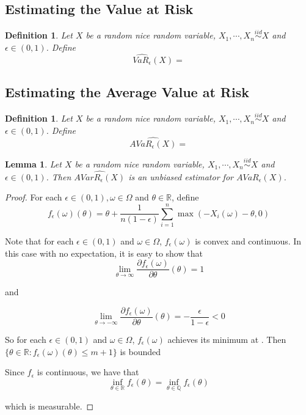 \documentclass[12pt]{amsart}
\newtheorem{lem}[thm]{Lemma}
\newtheorem{defn}[thm]{Definition}
\newcommand{\ep}{\epsilon}
\newcommand{\om}{\omega}
\newcommand{\Om}{\Omega}
\newcommand{\R}{\mathbb{R}}
\newcommand{\Q}{\mathbb{Q}}
\begin{document}
\subsection{Estimating the Value at Risk}

\begin{defn}
Let $X$ be a random nice random variable, $X_1, \cdots , X_n \stackrel{iid}{\sim} X$ and $\ep \in (0,1)$. Define $$\widehat{VaR_\ep}(X) = $$
\end{defn}

\subsection{Estimating the Average Value at Risk}

\begin{defn}
Let $X$ be a random nice random variable, $X_1, \cdots , X_n \stackrel{iid}{\sim} X$ and $\ep \in (0,1)$. Define $$ \widehat{AVaR_{\ep}(X)} = $$ 
\end{defn}

\begin{lem}
Let $X$ be a random nice random variable, $X_1, \cdots , X_n \stackrel{iid}{\sim} X$ and $\ep \in (0,1)$. Then $\widehat{AVarR_{\ep}(X)}$ is an unbiased estimator for $AVaR_{\ep}(X)$. 
\end{lem}

\begin{proof}
For each $\ep \in (0,1), \om \in \Om$ and $\theta \in \R$, define $$f_{\ep}(\om)(\theta) = \theta + \frac{1}{n (1-\ep)} \sum_{i=1}^n\max(-X_i(\om) - \theta, 0) $$ 

Note that for each $\ep \in (0,1)$ and $\om \in \Om$, $f_{\ep}(\om)$ is convex and continuous. In this case with no expectation, it is easy to show that $$\lim_{\theta \rightarrow \infty}\frac{\partial f_{\ep}(\om)}{\partial \theta}(\theta) = 1$$

and
 
$$\lim_{\theta \rightarrow -\infty}\frac{\partial f_{\ep}(\om)}{\partial \theta}(\theta) = -\frac{\ep}{1-\ep} <0$$  

So for each $\ep \in (0,1)$ and $\om \in \Om$, $f_{\ep}(\om)$ achieves its minimum at . Then $\{\theta \in \R: f_{\ep}(\om)(\theta)\leq m+1\}$ is bounded

Since $f_{\ep}$ is continuous, we have that $$\inf_{\theta \in \R} f_{\ep}(\theta) = \inf_{\theta \in \Q} f_{\ep}(\theta)$$ 

which is measurable. 

\end{proof} 



\end{document}
